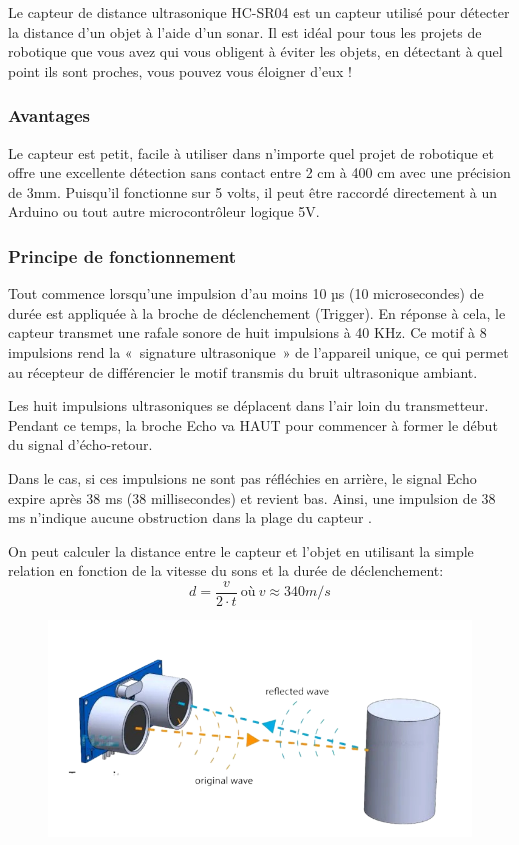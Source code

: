 Le capteur de distance ultrasonique HC-SR04 est un capteur utilisé pour détecter la distance d’un objet à l’aide d’un sonar. Il est idéal pour tous les projets de robotique que vous avez qui vous obligent à éviter les objets, en détectant à quel point ils sont proches, vous pouvez vous éloigner d’eux \cite{piborg-hc-sr04}!

\subsubsection{Avantages}
Le capteur est petit, facile à utiliser dans n’importe quel projet de robotique et offre une excellente détection sans contact entre 2 cm à 400 cm avec une précision de 3mm. Puisqu’il fonctionne sur 5 volts, il peut être raccordé directement à un Arduino ou tout autre microcontrôleur logique 5V.

\subsubsection{Principe de fonctionnement}
Tout commence lorsqu’une impulsion d’au moins 10 µs (10 microsecondes) de durée est appliquée à la broche de déclenchement (Trigger). En réponse à cela, le capteur transmet une rafale sonore de huit impulsions à 40 KHz. Ce motif à 8 impulsions rend la « signature ultrasonique » de l’appareil unique, ce qui permet au récepteur de différencier le motif transmis du bruit ultrasonique ambiant.

Les huit impulsions ultrasoniques se déplacent dans l’air loin du transmetteur. Pendant ce temps, la broche Echo va HAUT pour commencer à former le début du signal d’écho-retour.

Dans le cas, si ces impulsions ne sont pas réfléchies en arrière, le signal Echo expire après 38 ms (38 millisecondes) et revient bas. Ainsi, une impulsion de 38 ms n’indique aucune obstruction dans la plage du capteur \cite{hcsr04}.

On peut calculer la distance entre le capteur et l'objet en utilisant la simple relation en fonction de la vitesse du sons et la durée de déclenchement: \[d=\frac{v}{2 \cdot t} \ \text{où} \ v \approx 340 m/s\]


\begin{figure}[hbt!]
    \centering
    \includegraphics[width=14cm]{assets/HC-SR04/principe 3d.png}
\end{figure}

